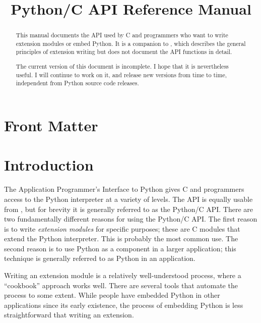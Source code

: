 \documentclass{manual}
\title{Python/C API Reference Manual}
\begin{document}
\maketitle

\ifhtml
\chapter*{Front Matter\label{front}}
\fi



\begin{abstract}

\noindent
This manual documents the API used by C and \Cpp{} programmers who
want to write extension modules or embed Python.  It is a companion to
, which describes the general principles of extension
writing but does not document the API functions in detail.

 The current version of this document is incomplete.
I hope that it is nevertheless useful.  I will continue to work on it,
and release new versions from time to time, independent from Python
source code releases.

\end{abstract}

\tableofcontents


\chapter{Introduction \label{intro}}

The Application Programmer's Interface to Python gives C and
\Cpp{} programmers access to the Python interpreter at a variety of
levels.  The API is equally usable from \Cpp{}, but for brevity it is
generally referred to as the Python/C API.  There are two
fundamentally different reasons for using the Python/C API.  The first
reason is to write \emph{extension modules} for specific purposes;
these are C modules that extend the Python interpreter.  This is
probably the most common use.  The second reason is to use Python as a
component in a larger application; this technique is generally
referred to as  Python in an application.

Writing an extension module is a relatively well-understood process, 
where a ``cookbook'' approach works well.  There are several tools 
that automate the process to some extent.  While people have embedded 
Python in other applications since its early existence, the process of 
embedding Python is less straightforward that writing an extension.  
\end{document}
